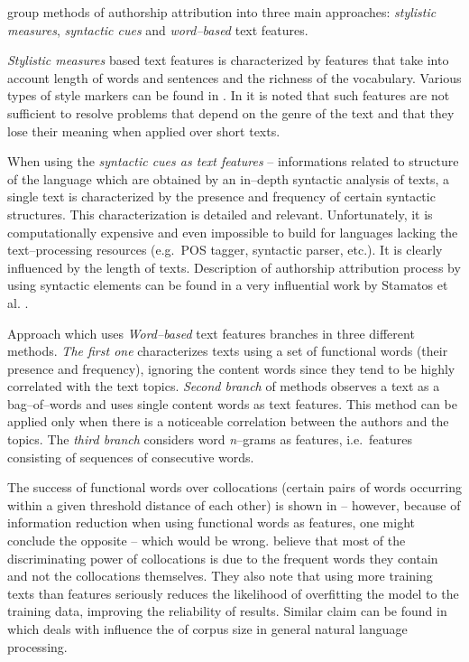 \documentclass[11pt,english]{article}
\begin{document}
\begin{multicols}{2}
\citet{coyotl2006authorship} group methods of authorship attribution into three
main approaches: \emph{stylistic measures}, \emph{syntactic cues} and
\emph{word--based} text features.

\emph{Stylistic measures} based text features is characterized by features
that take into account length of words and sentences and the
richness of the vocabulary. Various types of style markers can be found in
\citep{luyckx2005shallow}. In \citep{coyotl2006authorship} it is noted that such features are not sufficient to resolve problems that depend on the genre of the text and that they lose their meaning when applied over short texts.

When using the \emph{syntactic cues as text features} -- informations
related to structure of the language which are obtained by an in--depth syntactic
analysis of texts, a single text is characterized by the presence and frequency
of certain syntactic structures. This characterization is detailed and relevant.
Unfortunately, it is computationally expensive and even impossible to build for
languages lacking the text--processing resources (e.g.\ POS tagger, syntactic
parser, etc.). It is clearly influenced by the length of texts. Description of
authorship attribution process by using syntactic elements can be found in a very influential work by Stamatos et al.
\citep{stamatatos2001computer}.

Approach which uses \emph{Word--based} text features branches in three
different methods. \emph{The first one} characterizes texts using a set of
functional words (their presence and frequency), ignoring the content words since
they tend to be highly correlated with the text topics. \emph{Second branch}
of methods observes a text as a bag--of--words and uses single content words as
text features. This method can be applied only when there is a noticeable
correlation between the authors and the topics. The \emph{third branch} considers
word \emph{n}--grams as features, i.e.\ features consisting of sequences of
consecutive words.

The success of functional words over collocations (certain pairs of words
occurring within a given threshold distance of each other) is shown in
\citep{argamon2005measuring} -- however, because of information reduction when 
using functional words as features, one might conclude the opposite -- which would be
wrong. \citet{argamon2005measuring} believe that most of the discriminating power
of collocations is due to the frequent words they contain and not the
collocations themselves. They also note that using more training texts than
features seriously reduces the likelihood of overfitting the model to the
training data, improving the reliability of results. Similar claim can be found
in \citep{banko2001scaling} which deals with influence the of corpus size in
general natural language processing.


\end{multicols}
\end{document}
